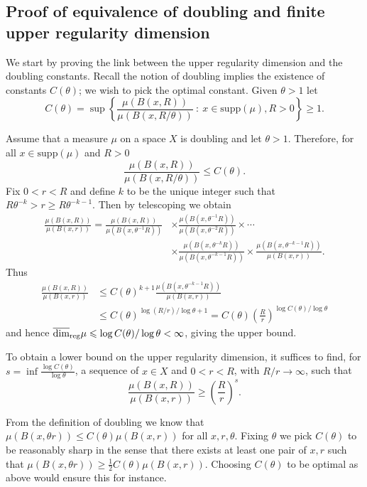 \subsection{Proof of equivalence of doubling and finite upper regularity dimension} \label{ch-upper-reg:doublingproof}


We start by proving the link between the upper regularity dimension and the doubling constants. Recall the notion of doubling implies the existence of constants $C(\theta)$; we wish to pick the optimal constant. Given $\theta > 1$ let
\[
C(\theta) = \sup \left\{ \frac{\mu(B(x,R))}{\mu(B(x,R/\theta))} \ : \ x \in \text{supp}(\mu), R>0 \right\} \geq 1.
\]

Assume that a measure $\mu$ on a space $X$ is doubling and let $\theta > 1$.  Therefore, for all $x \in \text{supp}(\mu)$ and $R>0$
\[
\frac{\mu(B(x,R))}{\mu(B(x,R/\theta))} \le C(\theta).
\]
Fix  $0< r < R$ and  define $k$ to be the unique integer such that $R\theta^{-k} > r \ge R\theta^{-k-1}$. Then by telescoping we obtain
\begin{align*}
    \frac{\mu(B(x,R))}{\mu(B(x,r))} = \frac{\mu(B(x,R))}{\mu(B(x,\theta^{-1} R))} &\times \frac{\mu(B(x,\theta^{-1} R))}{\mu(B(x,\theta^{-2} R))} \times\cdots \\
    &\times \frac{\mu(B(x,\theta^{-k} R))}{\mu(B(x,\theta^{-k-1}R))} \times \frac{\mu(B(x,\theta^{-k-1}R))}{\mu(B(x,r))}.
\end{align*}
Thus 
\begin{align*}
    \frac{\mu(B(x,R))}{\mu(B(x,r))}& \le C(\theta)^{k+1}  \frac{\mu(B(x,\theta^{-k-1}R))}{\mu(B(x,r))} \\
    &\le C(\theta)^{\log(R/r) / \log \theta+1} = C(\theta) \left(\frac{R}{r} \right)^{\log C(\theta) / \log \theta}
\end{align*}
and hence $\overline{\dim}_{\textup{reg}} \mu \leqslant \log C(\theta) / \log \theta < \infty$, giving the upper bound.


To obtain a lower bound on the upper regularity dimension, it suffices to find, for $s = \inf\frac{\log C(\theta)}{\log \theta}$, a sequence of $x\in X$ and $0<r<R$, with $R/r \rightarrow \infty$, such that 
\[
\frac{\mu(B(x,R))}{\mu(B(x,r))} \ge \left(\frac{R}{r}\right)^s.
\]
	
	
From the definition of doubling we know that $\mu(B(x,\theta r) ) \le C(\theta) \mu(B(x,r))$ for all $x,r, \theta$. Fixing $\theta$ we pick $C(\theta)$ to be reasonably sharp in the sense that there exists at least one pair of $x,r$ such that $\mu(B(x,\theta r) ) \ge \frac{1}{2}C(\theta) \mu(B(x,r))$. Choosing $C(\theta)$ to be optimal as above would ensure this for instance.
	
